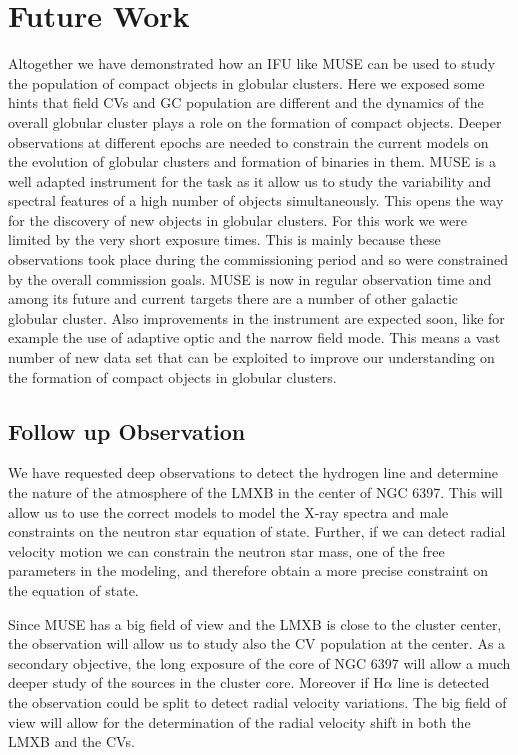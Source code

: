 \chapter{Future Work}\label{chap:future}
\thispagestyle{fancy}


Altogether we have demonstrated how an IFU like MUSE can be used to study the population of compact objects in globular clusters. Here we exposed some hints that field CVs and GC population are different and the dynamics of the overall globular cluster plays a role on the formation of compact objects. Deeper observations at different epochs are needed to constrain the current models on the evolution of globular clusters and formation of binaries in them. MUSE is a well adapted instrument for the task as it allow us to study the variability and spectral features of a high number of objects simultaneously. This opens the way for the discovery of new objects in globular clusters. For this work we were limited by the very short exposure times. This is mainly because these observations took place during the commissioning period and so were constrained by the overall commission goals. MUSE is now in regular observation time and among its future and current targets there are a number of other galactic globular cluster. Also improvements in the instrument are expected soon, like for example the use of adaptive optic and the narrow field mode. This means  a vast number of new data set that can be exploited to improve our understanding on the formation of compact objects in globular clusters. 

\section{Follow up Observation}

We have requested deep observations to detect the hydrogen line and determine the nature of the atmosphere of the LMXB in the center of NGC 6397. This will allow us to use the correct models to model the X-ray spectra and male constraints on the neutron star equation of state. Further, if we can detect radial velocity motion we can constrain the neutron star mass, one of the free parameters in the modeling, and therefore obtain a more precise constraint on the equation of state. 


 Since MUSE has a big field of view and the LMXB is close to the cluster center, the observation will allow us to study also the CV population at the center. As a secondary objective, the long exposure of the core of NGC 6397 will allow a much deeper study of the sources in the cluster core. Moreover if H$\alpha$ line is detected the observation could be split to detect radial velocity variations. The big field of view will allow for the determination of the radial velocity shift in both the LMXB and the CVs.  
    
